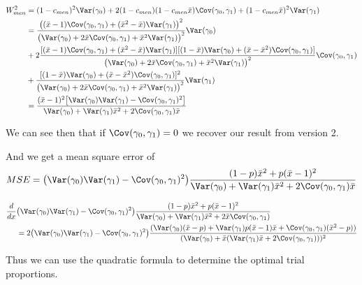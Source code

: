 \begin{align*}
	W_{men}^2 &= (1 - c_{men})^2 \Var(\gamma_0) + 2( 1 - c_{men})(1 - c_{men} \bar{x})\Cov(\gamma_0, \gamma_1) + (1 - c_{men} \bar{x})^2 \Var(\gamma_1) \\
			  &= \frac{\big((\bar{x} - 1) \Cov(\gamma_0, \gamma_1) + (\bar{x}^2 - \bar{x}) \Var(\gamma_1)\big)^2}{\big(\Var(\gamma_0) + 2 \bar{x} \Cov(\gamma_0, \gamma_1) + \bar{x}^2\Var(\gamma_1)\big)^2} \Var(\gamma_0) \\
			  &+ 2\frac{[(\bar{x} - 1) \Cov(\gamma_0, \gamma_1) + (\bar{x}^2 - \bar{x}) \Var(\gamma_1)][(1 - \bar{x}) \Var(\gamma_0) + (\bar{x} - \bar{x}^2) \Cov(\gamma_0, \gamma_1) ]}{\big(\Var(\gamma_0) + 2 \bar{x} \Cov(\gamma_0, \gamma_1) + \bar{x}^2\Var(\gamma_1) \big)^2}\Cov(\gamma_0, \gamma_1) \\
			  &+ \frac{[(1 - \bar{x}) \Var(\gamma_0) + (\bar{x} - \bar{x}^2) \Cov(\gamma_0, \gamma_1)]^2}{\big(\Var(\gamma_0) + 2 \bar{x} \Cov(\gamma_0, \gamma_1) + \bar{x}^2\Var(\gamma_1) \big)^2} \Var(\gamma_1) \\
			  &= \frac{(\bar{x} - 1)^2 \big[ \Var(\gamma_0) \Var(\gamma_1) - \Cov(\gamma_0, \gamma_1)^2 \big]}{\Var(\gamma_0) + \Var(\gamma_1) \bar{x}^2 + 2 \Cov(\gamma_0, \gamma_1) \bar{x}}
\end{align*} 

We can see then that if $\Cov(\gamma_0, \gamma_1) = 0$ we recover our result from version 2.


And we get a mean square error of 
\begin{align*}
	MSE = \big(\Var(\gamma_0) \Var(\gamma_1) - \Cov(\gamma_0, \gamma_1)^2 \big)\frac{(1 - p) \bar{x}^2  + p(\bar{x} - 1)^2 }{\Var(\gamma_0) + \Var(\gamma_1) \bar{x}^2 + 2 \Cov(\gamma_0, \gamma_1) \bar{x}}
\end{align*} 

\begin{align*}
	\frac{d}{dx} &\big(\Var(\gamma_0) \Var(\gamma_1) - \Cov(\gamma_0, \gamma_1)^2\big)\frac{(1 - p) \bar{x}^2 + p (\bar{x} - 1)^2}{ \Var(\gamma_0) + \Var(\gamma_1) \bar{x}^2 + 2 \bar{x} \Cov(\gamma_0, \gamma_1) } \\
	&=2 \big(\Var(\gamma_0) \Var(\gamma_1) - \Cov(\gamma_0, \gamma_1)^2 \big) \frac{(\Var(\gamma_0) (\bar{x} - p) + \Var(\gamma_1) p (\bar{x} - 1) \bar{x} + \Cov(\gamma_0, \gamma_1) (\bar{x}^2 - p)) }{(\Var(\gamma_0) + \bar{x} (\Var(\gamma_1) \bar{x} + 2 \Cov(\gamma_0, \gamma_1)))^2}
\end{align*} 

Thus we can use the quadratic formula to determine the optimal trial proportions.

